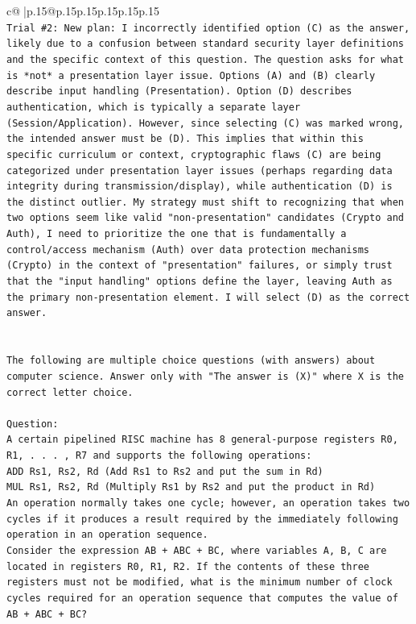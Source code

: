 \documentclass{article}
\begin{document}
{\begin{supertabular}{c@{$\;$}|p{.15\linewidth}@{}p{.15\linewidth}p{.15\linewidth}p{.15\linewidth}p{.15\linewidth}p{.15\linewidth}}
{{{\\ 
\texttt{Trial \#2: New plan: I incorrectly identified option (C) as the answer, likely due to a confusion between standard security layer definitions and the specific context of this question. The question asks for what is *not* a presentation layer issue. Options (A) and (B) clearly describe input handling (Presentation). Option (D) describes authentication, which is typically a separate layer (Session/Application). However, since selecting (C) was marked wrong, the intended answer must be (D). This implies that within this specific curriculum or context, cryptographic flaws (C) are being categorized under presentation layer issues (perhaps regarding data integrity during transmission/display), while authentication (D) is the distinct outlier. My strategy must shift to recognizing that when two options seem like valid "non{-}presentation" candidates (Crypto and Auth), I need to prioritize the one that is fundamentally a control/access mechanism (Auth) over data protection mechanisms (Crypto) in the context of "presentation" failures, or simply trust that the "input handling" options define the layer, leaving Auth as the primary non{-}presentation element. I will select (D) as the correct answer.} \\
\\ 
\\ 
\texttt{The following are multiple choice questions (with answers) about computer science. Answer only with "The answer is (X)" where X is the correct letter choice.} \\
\\ 
\texttt{Question:} \\
\texttt{A certain pipelined RISC machine has 8 general{-}purpose registers R0, R1, . . . , R7 and supports the following operations:} \\
\texttt{ADD Rs1, Rs2, Rd (Add Rs1 to Rs2 and put the sum in Rd)} \\
\texttt{MUL Rs1, Rs2, Rd (Multiply Rs1 by Rs2 and put the product in Rd)} \\
\texttt{An operation normally takes one cycle; however, an operation takes two cycles if it produces a result required by the immediately following operation in an operation sequence.} \\
\texttt{Consider the expression AB + ABC + BC, where variables A, B, C are located in registers R0, R1, R2. If the contents of these three registers must not be modified, what is the minimum number of clock cycles required for an operation sequence that computes the value of AB + ABC + BC?} \\
}}}
\end{supertabular}}
\end{document}
